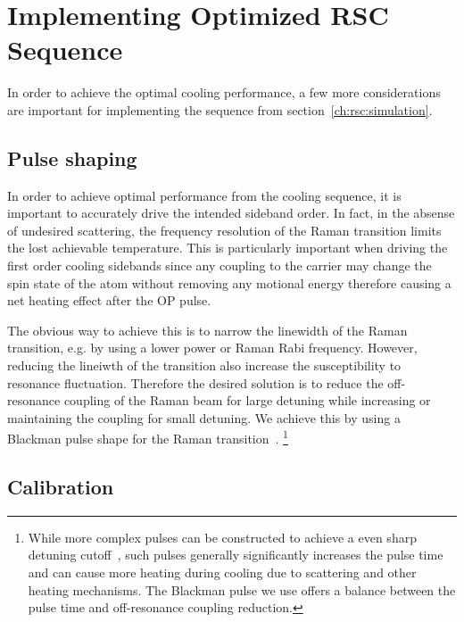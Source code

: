 \section{Implementing Optimized RSC Sequence}
\label{ch:rsc:implementation}

In order to achieve the optimal cooling performance, a few more considerations are important
for implementing the sequence from section~\ref{ch:rsc:simulation}.

\subsection{Pulse shaping}
\label{ch:rsc:implementation:pulse-shaping}

In order to achieve optimal performance from the cooling sequence,
it is important to accurately drive the intended sideband order.
In fact, in the absense of undesired scattering,
the frequency resolution of the Raman transition limits the lost achievable temperature.
This is particularly important when driving the first order cooling sidebands
since any coupling to the carrier may change the spin state of the atom without
removing any motional energy therefore causing a net heating effect after the OP pulse.

The obvious way to achieve this is to narrow the linewidth of the Raman transition,
e.g. by using a lower power or Raman Rabi frequency.
However, reducing the lineiwth of the transition also increase the susceptibility
to resonance fluctuation.
Therefore the desired solution is to reduce the off-resonance coupling of the Raman beam
for large detuning while increasing or maintaining the coupling for small detuning.
We achieve this by using a Blackman pulse shape for
the Raman transition~\cite{kasevich_laser_1992}.
\footnote{While more complex pulses can be constructed
  to achieve a even sharp detuning cutoff~\cite{fu_broadband_1995},
  such pulses generally significantly increases the pulse time
  and can cause more heating during cooling due to scattering and other heating mechanisms.
  The Blackman pulse we use offers a balance between the pulse time
  and off-resonance coupling reduction.}

\subsection{Calibration}
\label{ch:rsc:implementation:calibration}

